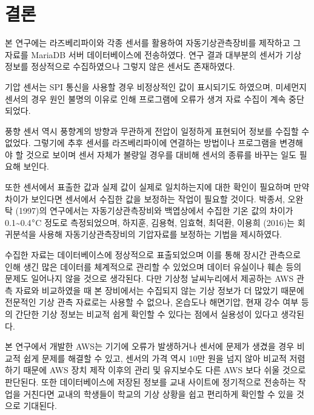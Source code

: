 \section{결론}

본 연구에는 라즈베리파이와 각종 센서를 활용하여 자동기상관측장비를 제작하고 그 자료를 MariaDB 서버 데이터베이스에 전송하였다. 연구 결과 대부분의 센서가 기상 정보를 정상적으로 수집하였으나 그렇지 않은 센서도 존재하였다. 

기압 센서는 SPI 통신을 사용할 경우 비정상적인 값이 표시되기도 하였으며, 미세먼지 센서의 경우 원인 불명의 이유로 인해 프로그램에 오류가 생겨 자료 수집이 계속 중단되었다. 

풍향 센서 역시 풍향계의 방향과 무관하게 전압이 일정하게 표현되어 정보를 수집할 수 없었다. 그렇기에 추후 센서를 라즈베리파이에 연결하는 방법이나 프로그램을 변경해야 할 것으로 보이며 센서 자체가 불량일 경우를 대비해 센서의 종류를 바꾸는 일도 필요해 보인다. 

또한 센서에서 표출한 값과 실제 값이 실제로 일치하는지에 대한 확인이 필요하며 만약 차이가 보인다면 센서에서 수집한 값을 보정하는 작업이 필요할 것이다. 박종서, 오완탁 (1997)의 연구에서는 자동기상관측장비와 백엽상에서 수집한 기온 값의 차이가 0.1\~{}0.4$\degree$C 정도로 측정되었으며, 하지훈, 김용혁, 임효혁, 최덕환, 이용희 (2016)는 회귀분석을 사용해 자동기상관측장비의 기압자료를 보정하는 기법을 제시하였다\cite{Ref3}\cite{Ref4}. 

수집한 자료는 데이터베이스에 정상적으로 표출되었으며 이를 통해 장시간 관측으로 인해 생긴 많은 데이터를 체계적으로 관리할 수 있었으며 데이터 유실이나 훼손 등의 문제도 일어나지 않을 것으로 생각된다. 다만 기상청 날씨누리에서 제공하는 AWS 관측 자료와 비교하였을 때 본 장비에서는 수집되지 않는 기상 정보가 더 많았기 때문에 전문적인 기상 관측 자료로는 사용할 수 없으나, 온습도나 해면기압, 현재 강수 여부 등의 간단한 기상 정보는 비교적 쉽게 확인할 수 있다는 점에서 실용성이 있다고 생각된다. 

본 연구에서 개발한 AWS는 기기에 오류가 발생하거나 센서에 문제가 생겼을 경우 비교적 쉽게 문제를 해결할 수 있고, 센서의 가격 역시 10만 원을 넘지 않아 비교적 저렴하기 때문에 AWS 장치 제작 이후의 관리 및 유지보수도 다른 AWS 보다 쉬울 것으로 판단된다. 또한 데이터베이스에 저장된 정보를 교내 사이트에 정기적으로 전송하는 작업을 거친다면 교내의 학생들이 학교의 기상 상황을 쉽고 편리하게 확인할 수 있을 것으로 기대된다.